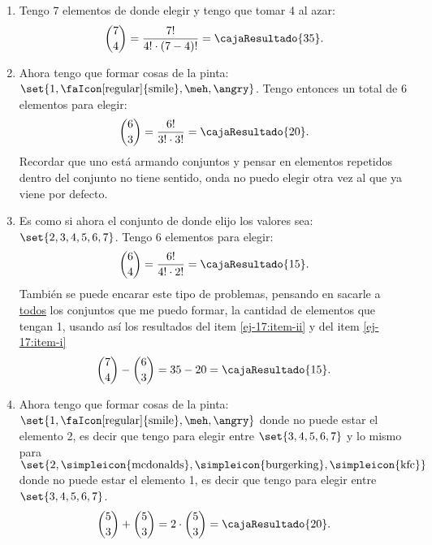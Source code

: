 \begin{enumerate}[label=\roman*)]
  \item\label{ej-17:item-i}  Tengo 7 elementos de donde elegir y tengo que tomar 4 al azar:
        $$\binom{7}{4} =
          \frac{7!}{4! \cdot (7-4)!} =
          \cajaResultado{
            35
          }
          .
        $$

  \item\label{ej-17:item-ii}
        Ahora tengo que formar cosas de la pinta: $\set{1,\text{\faIcon[regular]{smile}}, \text{\meh}, \text{\angry}}$.
        Tengo entonces un total de 6 elementos para elegir:
        $$
          \binom{6}{3} = \frac{6!}{3!\cdot 3!} =
          \cajaResultado{
            20
          }
          .
        $$
        Recordar que uno está armando conjuntos y pensar en elementos repetidos dentro del conjunto no tiene sentido, onda no puedo elegir otra vez al que
        ya viene por defecto.

  \item Es como si ahora el conjunto de donde elijo los valores sea: $\set{2,3,4,5,6,7}$. Tengo 6 elementos para elegir:
        $$
          \binom{6}{4} = \frac{6!}{4!\cdot 2!} =
          \cajaResultado{
            15
          }.
        $$
        También se puede encarar este tipo de problemas, pensando en sacarle a \underline{todos} los conjuntos que me puedo formar,
        la cantidad de elementos que tengan 1, usando así los resultados del item \ref{ej-17:item-ii} y del item \ref{ej-17:item-i}
        $$
          \binom{7}{4} - \binom{6}{3} = 35 - 20 =
          \cajaResultado{
            15
          }.
        $$

  \item
        Ahora tengo que formar cosas de la pinta: $\set{1,\text{\faIcon[regular]{smile}}, \text{\meh}, \text{\angry}}$ donde no puede
        estar el elemento 2, es decir que tengo para elegir entre $\set{3,4,5,6,7}$ y lo mismo para
        $\set{2,\text{\simpleicon{mcdonalds}}, \text{\simpleicon{burgerking}}, \text{\simpleicon{kfc}}}$ donde no puede
        estar el elemento 1, es decir que tengo para elegir entre $\set{3,4,5,6,7}$.
        $$
          \binom{5}{3} +
          \binom{5}{3} =
          2 \cdot \binom{5}{3} =
          \cajaResultado{
            20
          }.
        $$
\end{enumerate}

\begin{aportes}
  \item {}
  \item {}
\end{aportes}
